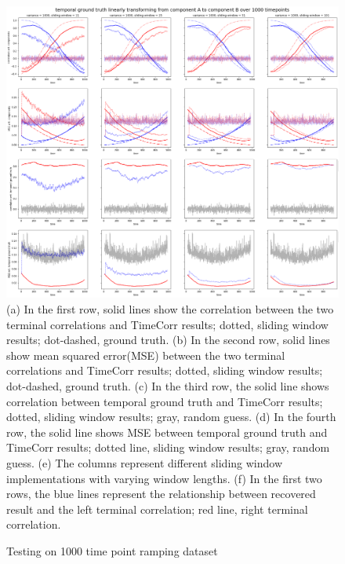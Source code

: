\documentclass[11pt]{article}
\begin{document}
\begin{figure}[!htb]
\caption{Testing on 1000 time point ramping dataset}
\includegraphics[width=1\textwidth]{../figures/SyntheticTesting/ramp1000t4slide.png}
\label{fig:ramp1000t4slide}
(a) In the first row, solid lines show the correlation between the two terminal correlations and TimeCorr results; dotted, sliding window results; dot-dashed, ground truth. (b) In the second row, solid lines show mean squared error(MSE) between the two terminal correlations and TimeCorr results; dotted, sliding window results; dot-dashed, ground truth. (c) In the third row, the solid line shows correlation between temporal ground truth and TimeCorr results; dotted, sliding window results; gray, random guess. (d) In the fourth row, the solid line shows MSE between temporal ground truth and TimeCorr results; dotted line, sliding window results; gray, random guess. (e) The columns represent different sliding window implementations with varying window lengths. (f) In the first two rows, the blue lines represent the relationship between recovered result and the left terminal correlation; red line, right terminal correlation.
\end{figure}
\end{document}
